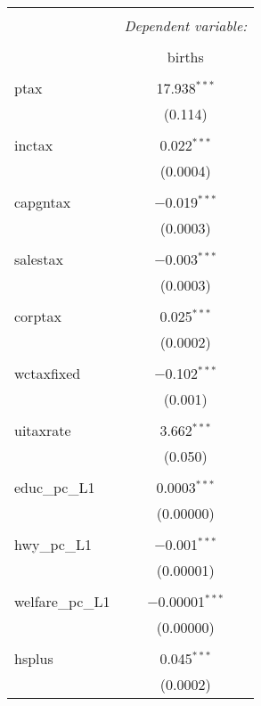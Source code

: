 
\begin{table}[!htbp] \centering 
  \caption{} 
  \label{} 
\begin{tabular}{@{\extracolsep{5pt}}lc} 
\\[-1.8ex]\hline 
\hline \\[-1.8ex] 
 & \multicolumn{1}{c}{\textit{Dependent variable:}} \\ 
\cline{2-2} 
\\[-1.8ex] & births \\ 
\hline \\[-1.8ex] 
 ptax & 17.938$^{***}$ \\ 
  & (0.114) \\ 
  & \\ 
 inctax & 0.022$^{***}$ \\ 
  & (0.0004) \\ 
  & \\ 
 capgntax & $-$0.019$^{***}$ \\ 
  & (0.0003) \\ 
  & \\ 
 salestax & $-$0.003$^{***}$ \\ 
  & (0.0003) \\ 
  & \\ 
 corptax & 0.025$^{***}$ \\ 
  & (0.0002) \\ 
  & \\ 
 wctaxfixed & $-$0.102$^{***}$ \\ 
  & (0.001) \\ 
  & \\ 
 uitaxrate & 3.662$^{***}$ \\ 
  & (0.050) \\ 
  & \\ 
 educ\_pc\_L1 & 0.0003$^{***}$ \\ 
  & (0.00000) \\ 
  & \\ 
 hwy\_pc\_L1 & $-$0.001$^{***}$ \\ 
  & (0.00001) \\ 
  & \\ 
 welfare\_pc\_L1 & $-$0.00001$^{***}$ \\ 
  & (0.00000) \\ 
  & \\ 
 hsplus & 0.045$^{***}$ \\ 
  & (0.0002) \\ 

\end{tabular}
\end{table}

